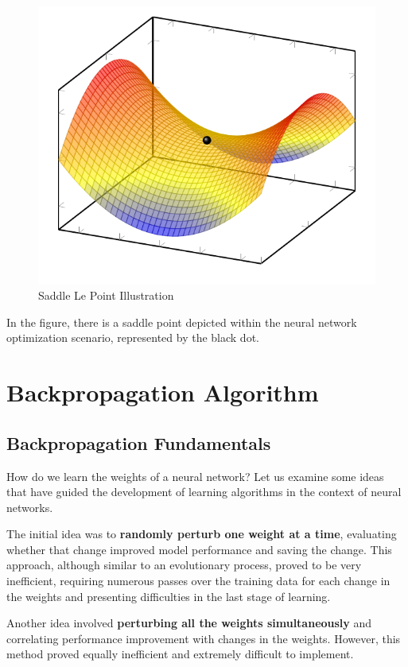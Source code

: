 \begin{figure}[!htbp]
    \centering
    \includegraphics[scale=0.88]{tikz/chapter2 - Saddle Point.pdf}
    \caption{Saddle Le Point Illustration}
\end{figure}

In the figure, there is a saddle point depicted within the neural network optimization scenario, represented by the black dot. 

\section{Backpropagation Algorithm}

\subsection{Backpropagation Fundamentals}
How do we learn the weights of a neural network? Let us examine some ideas that have guided the development of learning algorithms in the context of neural networks.

The initial idea was to \textbf{randomly perturb one weight at a time}, evaluating whether that change improved model performance and saving the change. This approach, although similar to an evolutionary process, proved to be very inefficient, requiring numerous passes over the training data for each change in the weights and presenting difficulties in the last stage of learning.

Another idea involved \textbf{perturbing all the weights simultaneously} and correlating performance improvement with changes in the weights. However, this method proved equally inefficient and extremely difficult to implement.

